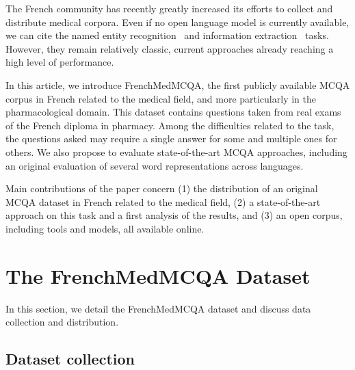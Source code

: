 \documentclass[11pt]{article}
\begin{document}
The French community has recently greatly increased its efforts to collect and distribute medical corpora. Even if no open language model is currently available, we can  cite the named entity recognition~\cite{neveol14quaero} and information extraction~\cite{grabar2018} tasks. However, they remain relatively classic, current approaches already reaching a high level of performance.

In this article, we introduce FrenchMedMCQA, the first publicly available MCQA corpus in French related to the medical field, and more particularly in the pharmacological domain. This dataset contains questions taken from real exams of the French  diploma in pharmacy. Among the difficulties related to the task, the questions asked may require a single answer for some and multiple ones for others. We also propose to evaluate state-of-the-art MCQA approaches, including an original evaluation of several word representations across languages.

Main contributions of the paper concern (1) the distribution of an original MCQA dataset in French related to the medical field, (2) a state-of-the-art approach on this task and a first analysis of the results, and (3) an open corpus, including tools and models, all available online.





\section{The FrenchMedMCQA Dataset}
\label{s:FrenchMedMCQA}

In this section, we detail the FrenchMedMCQA dataset and discuss data collection and distribution.





\subsection{Dataset collection}
\end{document}
